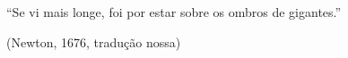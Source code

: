 \begin{epigrafe}
  ``Se vi mais longe, foi por estar sobre os ombros de gigantes.''

  \vspace{0.5em}
  \hfill (Newton, 1676, tradução nossa)
\end{epigrafe}

